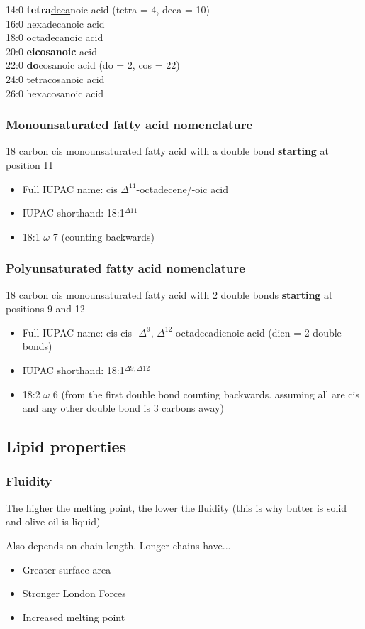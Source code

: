 \documentclass[letterpaper, 12pt]{article}
\begin{document}
14:0 \textbf{tetra}\underline{deca}noic acid (tetra = 4, deca = 10) \\
16:0 hexadecanoic acid \\
18:0 octadecanoic acid \\
20:0 \textbf{eicosanoic} acid \\
22:0 \textbf{do}\underline{cos}anoic acid (do = 2, cos = 22)\\
24:0 tetracosanoic acid \\
26:0 hexacosanoic acid

\subsubsection*{Monounsaturated fatty acid nomenclature}

18 carbon cis monounsaturated fatty acid with a double bond \textbf{starting} at position 11

\begin{itemize}
\item Full IUPAC name: cis $\Delta^{11}$-octadecene/-oic acid
\item IUPAC shorthand: 18:1$^{\Delta 11}$
\item 18:1 $\omega$ 7 (counting backwards)
\end{itemize}

\subsubsection*{Polyunsaturated fatty acid nomenclature}

18 carbon cis monounsaturated fatty acid with 2 double bonds \textbf{starting} at positions 9 and 12
\begin{itemize}
\item Full IUPAC name: cis-cis- $\Delta^{9}$, $\Delta^{12}$-octadecadienoic acid (dien = 2 double bonds)
\item IUPAC shorthand: 18:1$^{\Delta 9, \Delta 12}$
\item 18:2 $\omega$ 6 (from the first double bond counting backwards. assuming all are cis and any other double bond is 3 carbons away)
\end{itemize}

\subsection*{Lipid properties}

\subsubsection*{Fluidity}
The higher the melting point, the lower the fluidity (this is why butter is solid and olive oil is liquid)

Also depends on chain length. Longer chains have...

\begin{itemize}
\item Greater surface area
\item Stronger London Forces
\item Increased melting point
\end{itemize}
\end{document}
